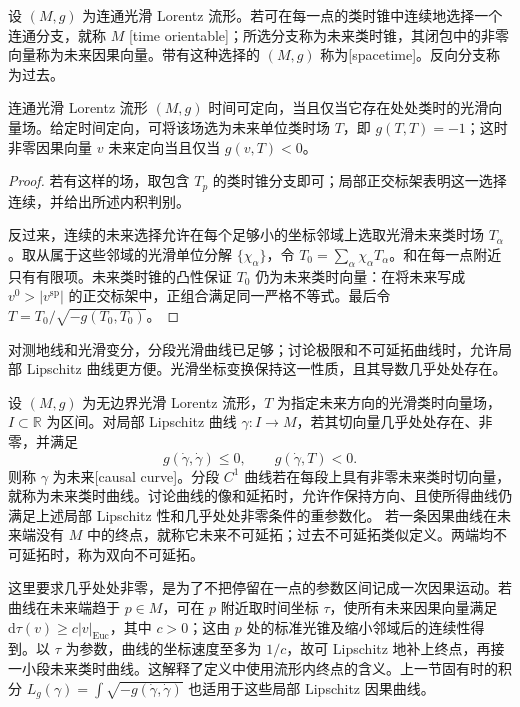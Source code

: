 \begin{definition}\label{g3:def:A-time-orientation}
	设 \((M,g)\) 为连通光滑 Lorentz 流形。若可在每一点的类时锥中连续地选择一个连通分支，就称 \(M\) [time orientable]；所选分支称为未来类时锥，其闭包中的非零向量称为未来因果向量。带有这种选择的 \((M,g)\) 称为[spacetime]。反向分支称为过去。
\end{definition}

\begin{proposition}\label{g3:prop:A-time-orientation-field}
	连通光滑 Lorentz 流形 \((M,g)\) 时间可定向，当且仅当它存在处处类时的光滑向量场。给定时间定向，可将该场选为未来单位类时场 \(T\)，即 \(g(T,T)=-1\)；这时非零因果向量 \(v\) 未来定向当且仅当 \(g(v,T)<0\)。
\end{proposition}
\begin{proof}
	若有这样的场，取包含 \(T_p\) 的类时锥分支即可；局部正交标架表明这一选择连续，并给出所述内积判别。

	反过来，连续的未来选择允许在每个足够小的坐标邻域上选取光滑未来类时场 \(T_\alpha\)。取从属于这些邻域的光滑单位分解 \(\{\chi_\alpha\}\)，令 \(T_0=\sum_\alpha\chi_\alpha T_\alpha\)。和在每一点附近只有有限项。未来类时锥的凸性保证 \(T_0\) 仍为未来类时向量：在将未来写成 \(v^0>|v^{\mathrm{sp}}|\) 的正交标架中，正组合满足同一严格不等式。最后令 \(T=T_0/\sqrt{-g(T_0,T_0)}\)。
\end{proof}

对测地线和光滑变分，分段光滑曲线已足够；讨论极限和不可延拓曲线时，允许局部 Lipschitz 曲线更方便。光滑坐标变换保持这一性质，且其导数几乎处处存在。

\begin{definition}\label{g3:def:A-causal-curves}
	设 \((M,g)\) 为无边界光滑 Lorentz 流形，\(T\) 为指定未来方向的光滑类时向量场，\(I\subset\mathbb R\) 为区间。对局部 Lipschitz 曲线 \(\gamma:I\to M\)，若其切向量几乎处处存在、非零，并满足
	\[
		g(\dot\gamma,\dot\gamma)\le0,
		\qquad g(\dot\gamma,T)<0.
	\]
	则称 \(\gamma\) 为未来[causal curve]。分段 \(C^1\) 曲线若在每段上具有非零未来类时切向量，就称为未来类时曲线。讨论曲线的像和延拓时，允许作保持方向、且使所得曲线仍满足上述局部 Lipschitz 性和几乎处处非零条件的重参数化。
	若一条因果曲线在未来端没有 \(M\) 中的终点，就称它未来不可延拓；过去不可延拓类似定义。两端均不可延拓时，称为双向不可延拓。
\end{definition}

这里要求几乎处处非零，是为了不把停留在一点的参数区间记成一次因果运动。若曲线在未来端趋于 \(p\in M\)，可在 \(p\) 附近取时间坐标 \(\tau\)，使所有未来因果向量满足 \(\mathrm d\tau(v)\ge c|v|_{\mathrm{Euc}}\)，其中 \(c>0\)；这由 \(p\) 处的标准光锥及缩小邻域后的连续性得到。以 \(\tau\) 为参数，曲线的坐标速度至多为 \(1/c\)，故可 Lipschitz 地补上终点，再接一小段未来类时曲线。这解释了定义中使用流形内终点的含义。上一节固有时的积分
\(L_g(\gamma)=\int\sqrt{-g(\dot\gamma,\dot\gamma)}\)
也适用于这些局部 Lipschitz 因果曲线。

